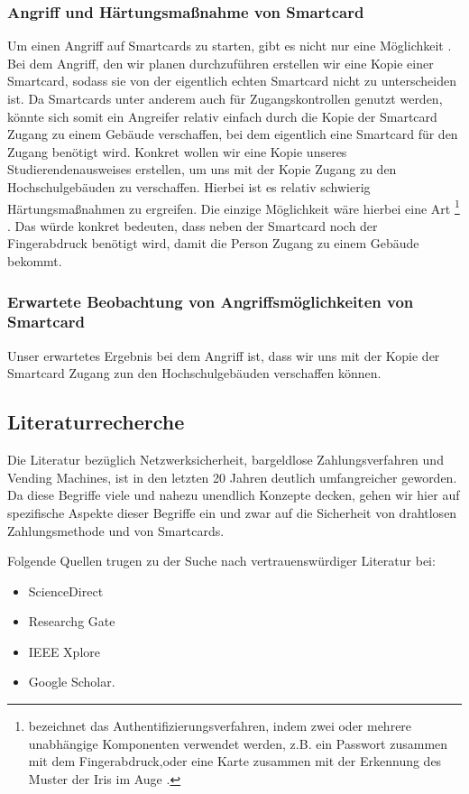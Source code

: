 \subsubsection{Angriff und Härtungsmaßnahme von Smartcard}
Um einen Angriff auf Smartcards zu starten, gibt es nicht nur eine Möglichkeit \cite{refart:TKSK}. Bei dem Angriff, den wir planen 
durchzuführen erstellen wir eine Kopie einer Smartcard, sodass sie von der eigentlich echten Smartcard nicht zu unterscheiden ist.
Da Smartcards unter anderem auch für Zugangskontrollen genutzt werden, könnte sich somit ein Angreifer relativ einfach durch 
die Kopie der Smartcard Zugang zu einem Gebäude verschaffen, bei dem eigentlich eine Smartcard für den Zugang benötigt wird.
Konkret wollen wir eine Kopie unseres Studierendenausweises erstellen, um uns mit der Kopie Zugang zu den Hochschulgebäuden 
zu verschaffen. Hierbei ist es relativ schwierig Härtungsmaßnahmen zu ergreifen. Die einzige Möglichkeit wäre hierbei eine Art
\footnote{ bezeichnet das Authentifizierungsverfahren, indem zwei oder mehrere unabhängige 
Komponenten verwendet werden, z.B. ein Passwort zusammen mit dem Fingerabdruck,oder eine Karte  zusammen mit der Erkennung 
des Muster der Iris im Auge \cite{refip:simf}.} \cite{refst:2fa}. Das würde konkret bedeuten, dass neben der Smartcard noch 
der Fingerabdruck benötigt wird, damit die Person Zugang zu einem Gebäude bekommt.


\subsubsection{Erwartete Beobachtung von Angriffsmöglichkeiten von Smartcard}
Unser erwartetes Ergebnis bei dem Angriff ist, dass wir uns mit der Kopie der Smartcard Zugang zun den Hochschulgebäuden 
verschaffen können. 


\subsection{Literaturrecherche}

Die Literatur bezüglich Netzwerksicherheit, bargeldlose Zahlungsverfahren und Vending Machines, ist in den letzten 20 
Jahren deutlich umfangreicher geworden. Da diese Begriffe viele und nahezu unendlich Konzepte decken, gehen wir hier
auf spezifische Aspekte dieser Begriffe ein und zwar auf die Sicherheit von drahtlosen Zahlungsmethode und von 
Smartcards. 

Folgende Quellen trugen zu der Suche nach vertrauenswürdiger Literatur bei:

\begin{itemize}
    \item ScienceDirect
    \item Researchg Gate
    \item IEEE Xplore
    \item Google Scholar.
\end{itemize}

